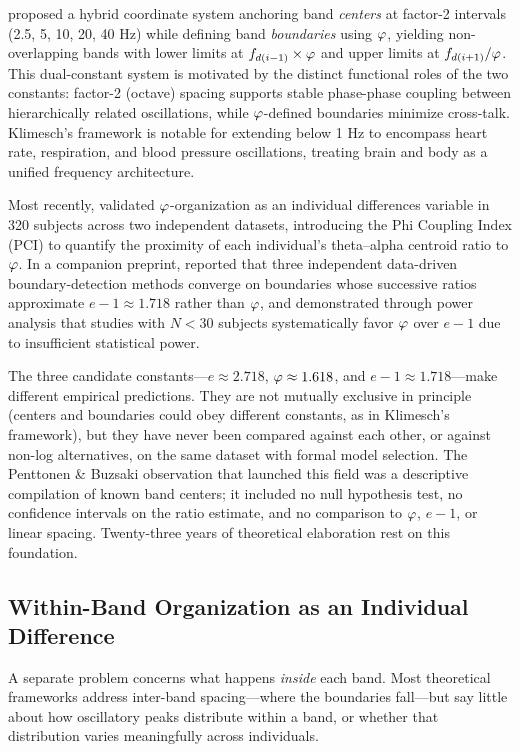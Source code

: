 \textcite{klimesch2018frequency} proposed a hybrid coordinate system anchoring band \emph{centers} at factor-2 intervals (2.5, 5, 10, 20, 40 Hz) while defining band \emph{boundaries} using $\varphi$, yielding non-overlapping bands with lower limits at $f_{d(i-1)} \times \varphi$ and upper limits at $f_{d(i+1)} / \varphi$. This dual-constant system is motivated by the distinct functional roles of the two constants: factor-2 (octave) spacing supports stable phase-phase coupling between hierarchically related oscillations, while $\varphi$-defined boundaries minimize cross-talk. Klimesch's framework is notable for extending below 1 Hz to encompass heart rate, respiration, and blood pressure oscillations, treating brain and body as a unified frequency architecture.

Most recently, \textcite{ursachi2026phi} validated $\varphi$-organization as an individual differences variable in 320 subjects across two independent datasets, introducing the Phi Coupling Index (PCI) to quantify the proximity of each individual's theta--alpha centroid ratio to $\varphi$. In a companion preprint, \textcite{ursachi2026boundaries} reported that three independent data-driven boundary-detection methods converge on boundaries whose successive ratios approximate $e - 1 \approx 1.718$ rather than $\varphi$, and demonstrated through power analysis that studies with $N < 30$ subjects systematically favor $\varphi$ over $e-1$ due to insufficient statistical power.

The three candidate constants---$e \approx 2.718$, $\varphi \approx 1.618$, and $e - 1 \approx 1.718$---make different empirical predictions. They are not mutually exclusive in principle (centers and boundaries could obey different constants, as in Klimesch's framework), but they have never been compared against each other, or against non-log alternatives, on the same dataset with formal model selection. The Penttonen \& Buzsaki observation that launched this field was a descriptive compilation of known band centers; it included no null hypothesis test, no confidence intervals on the ratio estimate, and no comparison to $\varphi$, $e-1$, or linear spacing. Twenty-three years of theoretical elaboration rest on this foundation.

\subsection{Within-Band Organization as an Individual Difference}

A separate problem concerns what happens \emph{inside} each band. Most theoretical frameworks address inter-band spacing---where the boundaries fall---but say little about how oscillatory peaks distribute within a band, or whether that distribution varies meaningfully across individuals.


